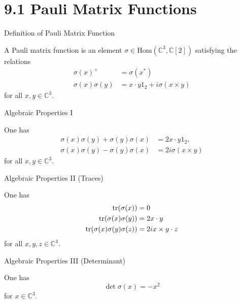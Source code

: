 \section{9.1 Pauli Matrix Functions}

\begin{frame}{Definition of Pauli Matrix Function}
    \begin{definition}[9.1.1]
        A Pauli matrix function is an element $\sigma \in \text{Hom}(\mathbb{C}^3, \mathbb{C}[2])$ satisfying the relations
        \begin{align*}
            \sigma(x)^+        & = \sigma(x^*)                         \\
            \sigma(x)\sigma(y) & = x \cdot y 1_2 + i\sigma(x \times y)
        \end{align*}
        for all $x, y \in \mathbb{C}^3$.
    \end{definition}
\end{frame}

\begin{frame}{Algebraic Properties I}
    \begin{proposition}[9.1.1]
        One has
        \begin{align*}
            \sigma(x)\sigma(y) + \sigma(y)\sigma(x) & = 2x \cdot y 1_2,      \\
            \sigma(x)\sigma(y) - \sigma(y)\sigma(x) & = 2i\sigma(x \times y)
        \end{align*}
        for all $x, y \in \mathbb{C}^3$.
    \end{proposition}
\end{frame}

\begin{frame}{Algebraic Properties II (Traces)}
    \begin{proposition}[9.1.2]
        One has
        \begin{align*}
            \tr(\sigma(x))                   & = 0                    \\
            \tr(\sigma(x)\sigma(y))          & = 2x \cdot y           \\
            \tr(\sigma(x)\sigma(y)\sigma(z)) & = 2ix \times y \cdot z
        \end{align*}
        for all $x, y, z \in \mathbb{C}^3$.
    \end{proposition}
\end{frame}

\begin{frame}{Algebraic Properties III (Determinant)}
    \begin{proposition}[9.1.3]
        One has
        \[ \det \sigma(x) = -x^2 \]
        for $x \in \mathbb{C}^3$.
    \end{proposition}
\end{frame}

